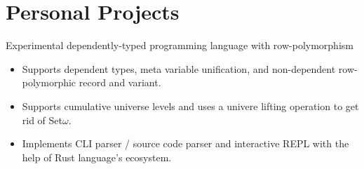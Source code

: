 \documentclass{resume}
\begin{document}
\section{Personal Projects}


Experimental dependently-typed programming language with row-polymorphism
\begin{itemize}
  \item Supports dependent types, meta variable unification, and non-dependent row-polymorphic record and variant.
  \item Supports cumulative universe levels and uses a univere lifting operation to get rid of Set$\omega$.
  \item Implements CLI parser / source code parser and interactive REPL with the help of Rust language's ecosystem.
\end{itemize}
\end{document}
